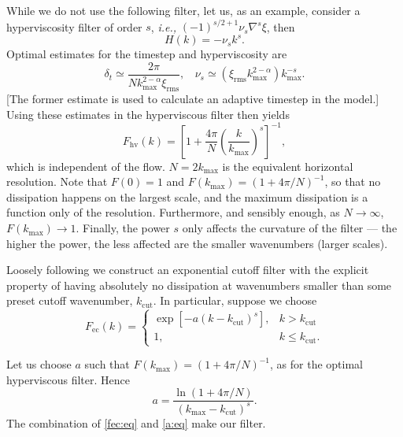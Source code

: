 \documentclass{jfm}
\newcommand{\ie}  {\textit{i.e., }}
\newcommand{\eg}  {\textit{e.g., }}
\newcommand{\rms} {\mathrm{rms}}
\newcommand{\del} {\nabla}
\begin{document}
While we do not use the following filter, let us, as an example,
consider a hyperviscosity filter of order $s$, \ie
$(-1)^{s/2+1}\nu_s\del^s \xi$, then
\[
H(k) = -\nu_s k^s.
\]
Optimal estimates for the timestep and hyperviscosity are \citep[see,
\eg][]{Maltrud91}
\begin{equation}
\delta_t
\simeq \frac{2\pi}{Nk_{\mathrm{max}}^{2-\alpha}\xi_{\rms}}, ~~~~
\nu_s
\simeq (\xi_{\rms}k_{\mathrm{max}}^{2-\alpha})
k_{\mathrm{max}}^{-s}.
\end{equation}
[The former estimate is used to calculate an adaptive timestep in
the model.] Using these estimates in the hyperviscous filter then
yields
\begin{equation}
F_{\mathrm{hv}}(k) =
\left[1+\frac{4\pi}{N}\left(\frac{k}{k_{\mathrm{max}}}\right)^s\right]^{-1},
\end{equation}
which is independent of the flow.  $N=2k_{\mathrm{max}}$ is the
equivalent horizontal resolution.  Note that $F(0)=1$ and
$F(k_{\mathrm{max}}) = (1+4\pi/N)^{-1}$, so that no dissipation
happens on the largest scale, and the maximum dissipation is a
function only of the resolution.  Furthermore, and sensibly enough, as
$N\rightarrow\infty$, $F(k_{\mathrm{max}})\rightarrow 1$.  Finally,
the power $s$ only affects the curvature of the filter --- the higher
the power, the less affected are the smaller wavenumbers (larger
scales).

Loosely following \citet[][and personal communication]{Lacasce96} we
construct an exponential cutoff filter with the explicit property of
having absolutely no dissipation at wavenumbers smaller than some
preset cutoff wavenumber, $k_{\mathrm{cut}}$.  In particular, suppose
we choose
\begin{equation}
F_{\mathrm{ec}}(k) = \left\{
\begin{array}{ll}
    \exp[-a (k-k_{\mathrm{cut}})^s],     & \mbox{$k>k_{\mathrm{cut}}$}   \\
    1,                                   & \mbox{$k\le k_{\mathrm{cut}}$}.
\end{array}
\right.
\label{fec:eq}
\end{equation}

Let us choose $a$ such that $F(k_{\mathrm{max}}) = (1+4\pi/N)^{-1}$, as
for the optimal hyperviscous filter.  Hence
\begin{equation}
a= \frac{\ln(1+4\pi/N)}{(k_{\mathrm{max}}-k_{\mathrm{cut}})^s}.
\label{a:eq}
\end{equation}
The combination of \eqref{fec:eq} and \eqref{a:eq} make our filter.
\end{document}
